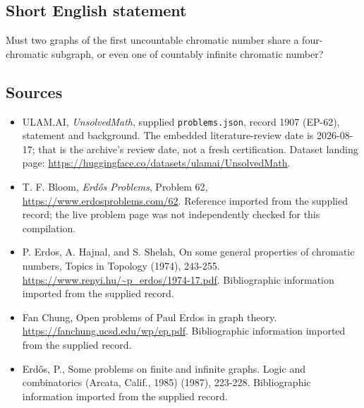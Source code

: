 \documentclass[11pt,a4paper]{article}
\begin{document}
\subsection{Short English statement}

Must two graphs of the first uncountable chromatic number share a four-chromatic subgraph, or even one of countably infinite chromatic number?

\subsection{Sources}

{\small

\begin{itemize}

\item[\hypertarget{source:1907:1}{S1}] ULAM.AI, \emph{UnsolvedMath}, supplied \texttt{problems.json}, record 1907 (EP-62), statement and background. The embedded literature-review date is 2026-08-17; that is the archive’s review date, not a fresh certification. Dataset landing page: \url{https://huggingface.co/datasets/ulamai/UnsolvedMath}.

\item[\hypertarget{source:1907:2}{S2}] T. F. Bloom, \emph{Erdős Problems}, Problem 62, \url{https://www.erdosproblems.com/62}. Reference imported from the supplied record; the live problem page was not independently checked for this compilation.

\item[\hypertarget{source:1907:3}{S3}] P. Erdos, A. Hajnal, and S. Shelah, On some general properties of chromatic numbers, Topics in Topology (1974), 243-255. \url{https://www.renyi.hu/~p_erdos/1974-17.pdf}. Bibliographic information imported from the supplied record.

\item[\hypertarget{source:1907:4}{S4}] Fan Chung, Open problems of Paul Erdos in graph theory. \url{https://fanchung.ucsd.edu/wp/ep.pdf}. Bibliographic information imported from the supplied record.

\item[\hypertarget{source:1907:5}{S5}] Erd\H{o}s, P., Some problems on finite and infinite graphs. Logic and combinatorics (Arcata, Calif., 1985) (1987), 223-228. Bibliographic information imported from the supplied record.

\end{itemize}

}

\label{end:1907}
\end{document}
